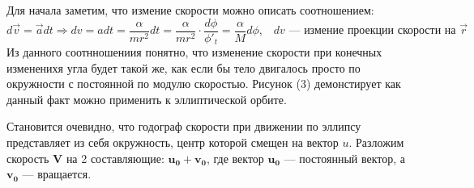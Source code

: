 \documentclass[12pt]{article}
\begin{document}
	Для начала заметим, что измение скорости можно описать соотношением:
	\[ d\vec{v} = \vec{a} dt \Rightarrow d v = adt = \frac{\alpha}{mr^2} dt = \frac{\alpha}{m r^2}\cdot \frac{d\phi}{\phi'_t} = \frac{\alpha}{M} d\phi, \;\;\;\text{$dv$ --- измение проекции скорости на $\vec{r}$}\]
	Из данного соотнношениия понятно, что изменение скорости при конечных измененихя угла будет такой же, как если бы тело двигалось просто по окружности с постоянной по модулю скоростью. Рисунок (3) демонстирует как данный факт можно применить к эллиптической орбите. 
	\pagebreak
	
	Становится очевидно, что годограф скорости при движении по эллипсу представляет из себя окружность, центр которой смещен на вектор $u$. Разложим скорость $\mathbf{V}$ на 2 составляющие: $\mathbf{u_0} + \mathbf{v_0}$, где вектор $\mathbf{u_0}$ --- постоянный вектор, а $\mathbf{v_0}$ --- вращается.
	
\end{document}
